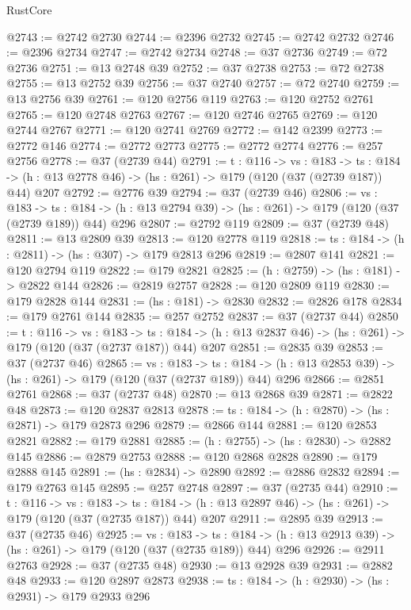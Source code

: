 \begin{lexlean}{RustCore}
\begin{coremodule}
@2743 := @2742 @2730
@2744 := @2396 @2732
@2745 := @2742 @2732
@2746 := @2396 @2734
@2747 := @2742 @2734
@2748 := @37 @2736
@2749 := @72 @2736
@2751 := @13 @2748 @39
@2752 := @37 @2738
@2753 := @72 @2738
@2755 := @13 @2752 @39
@2756 := @37 @2740
@2757 := @72 @2740
@2759 := @13 @2756 @39
@2761 := @120 @2756 @119
@2763 := @120 @2752 @2761
@2765 := @120 @2748 @2763
@2767 := @120 @2746 @2765
@2769 := @120 @2744 @2767
@2771 := @120 @2741 @2769
@2772 := @142 @2399
@2773 := @2772 @146
@2774 := @2772 @2773
@2775 := @2772 @2774
@2776 := @257 @2756
@2778 := @37 (@2739 @44)
@2791 := {t : @116} ->
  {vs : @183} ->
  {ts : @184} -> (h : @13 @2778 @46) -> (hs : @261) -> @179 (@120 (@37 (@2739 @187)) @44) @207
@2792 := @2776 @39
@2794 := @37 (@2739 @46)
@2806 := {vs : @183} ->
  {ts : @184} -> (h : @13 @2794 @39) -> (hs : @261) -> @179 (@120 (@37 (@2739 @189)) @44) @296
@2807 := @2792 @119
@2809 := @37 (@2739 @48)
@2811 := @13 @2809 @39
@2813 := @120 @2778 @119
@2818 := {ts : @184} -> (h : @2811) -> (hs : @307) -> @179 @2813 @296
@2819 := @2807 @141
@2821 := @120 @2794 @119
@2822 := @179 @2821
@2825 := (h : @2759) -> (hs : @181) -> @2822 @144
@2826 := @2819 @2757
@2828 := @120 @2809 @119
@2830 := @179 @2828 @144
@2831 := (hs : @181) -> @2830
@2832 := @2826 @178
@2834 := @179 @2761 @144
@2835 := @257 @2752
@2837 := @37 (@2737 @44)
@2850 := {t : @116} ->
  {vs : @183} ->
  {ts : @184} -> (h : @13 @2837 @46) -> (hs : @261) -> @179 (@120 (@37 (@2737 @187)) @44) @207
@2851 := @2835 @39
@2853 := @37 (@2737 @46)
@2865 := {vs : @183} ->
  {ts : @184} -> (h : @13 @2853 @39) -> (hs : @261) -> @179 (@120 (@37 (@2737 @189)) @44) @296
@2866 := @2851 @2761
@2868 := @37 (@2737 @48)
@2870 := @13 @2868 @39
@2871 := @2822 @48
@2873 := @120 @2837 @2813
@2878 := {ts : @184} -> (h : @2870) -> (hs : @2871) -> @179 @2873 @296
@2879 := @2866 @144
@2881 := @120 @2853 @2821
@2882 := @179 @2881
@2885 := (h : @2755) -> (hs : @2830) -> @2882 @145
@2886 := @2879 @2753
@2888 := @120 @2868 @2828
@2890 := @179 @2888 @145
@2891 := (hs : @2834) -> @2890
@2892 := @2886 @2832
@2894 := @179 @2763 @145
@2895 := @257 @2748
@2897 := @37 (@2735 @44)
@2910 := {t : @116} ->
  {vs : @183} ->
  {ts : @184} -> (h : @13 @2897 @46) -> (hs : @261) -> @179 (@120 (@37 (@2735 @187)) @44) @207
@2911 := @2895 @39
@2913 := @37 (@2735 @46)
@2925 := {vs : @183} ->
  {ts : @184} -> (h : @13 @2913 @39) -> (hs : @261) -> @179 (@120 (@37 (@2735 @189)) @44) @296
@2926 := @2911 @2763
@2928 := @37 (@2735 @48)
@2930 := @13 @2928 @39
@2931 := @2882 @48
@2933 := @120 @2897 @2873
@2938 := {ts : @184} -> (h : @2930) -> (hs : @2931) -> @179 @2933 @296

\end{coremodule}
\end{lexlean}
